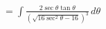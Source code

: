\documentclass[preview]{standalone}
\begin{document}
\begin{align*}
&=\int \frac{2\sec\theta\tan\theta}{(\sqrt{16\sec^2\theta-16})^3} \, d\theta \\
\end{align*}
\end{document}
